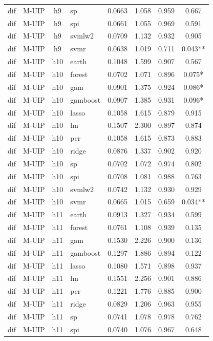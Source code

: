\begin{ThreePartTable}
\begin{longtable}[t]{llclcccc}
dif & M-UIP & h9 & sp & 0.0663 & 1.058 & 0.959 & 0.667\\
dif & M-UIP & h9 & spi & 0.0661 & 1.055 & 0.969 & 0.591\\
dif & M-UIP & h9 & svmlw2 & 0.0709 & 1.132 & 0.932 & 0.905\\
dif & M-UIP & h9 & svmr & 0.0638 & 1.019 & 0.711 & 0.043**\\
\addlinespace
dif & M-UIP & h10 & earth & 0.1048 & 1.599 & 0.907 & 0.567\\
dif & M-UIP & h10 & forest & 0.0702 & 1.071 & 0.896 & 0.075*\\
dif & M-UIP & h10 & gam & 0.0901 & 1.375 & 0.924 & 0.086*\\
dif & M-UIP & h10 & gamboost & 0.0907 & 1.385 & 0.931 & 0.096*\\
dif & M-UIP & h10 & lasso & 0.1058 & 1.615 & 0.879 & 0.915\\
dif & M-UIP & h10 & lm & 0.1507 & 2.300 & 0.897 & 0.874\\
dif & M-UIP & h10 & pcr & 0.1058 & 1.615 & 0.873 & 0.883\\
dif & M-UIP & h10 & ridge & 0.0876 & 1.337 & 0.902 & 0.920\\
dif & M-UIP & h10 & sp & 0.0702 & 1.072 & 0.974 & 0.802\\
dif & M-UIP & h10 & spi & 0.0708 & 1.081 & 0.988 & 0.763\\
dif & M-UIP & h10 & svmlw2 & 0.0742 & 1.132 & 0.930 & 0.929\\
dif & M-UIP & h10 & svmr & 0.0665 & 1.015 & 0.659 & 0.034**\\
\addlinespace
dif & M-UIP & h11 & earth & 0.0913 & 1.327 & 0.934 & 0.599\\
dif & M-UIP & h11 & forest & 0.0761 & 1.108 & 0.939 & 0.135\\
dif & M-UIP & h11 & gam & 0.1530 & 2.226 & 0.900 & 0.136\\
dif & M-UIP & h11 & gamboost & 0.1297 & 1.886 & 0.894 & 0.122\\
dif & M-UIP & h11 & lasso & 0.1080 & 1.571 & 0.898 & 0.937\\
dif & M-UIP & h11 & lm & 0.1551 & 2.256 & 0.901 & 0.886\\
dif & M-UIP & h11 & pcr & 0.1221 & 1.776 & 0.885 & 0.900\\
dif & M-UIP & h11 & ridge & 0.0829 & 1.206 & 0.963 & 0.955\\
dif & M-UIP & h11 & sp & 0.0741 & 1.078 & 0.978 & 0.762\\
dif & M-UIP & h11 & spi & 0.0740 & 1.076 & 0.967 & 0.648\\

\end{longtable}
\end{ThreePartTable}
